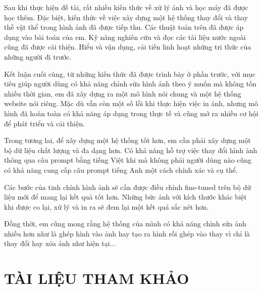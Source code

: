 \documentclass[12pt]{report}
\begin{document}
Sau khi thực hiện đề tài, rất nhiều kiến thức về xử lý ảnh và học máy đã được học thêm. Đặc biệt, kiến thức về việc xây dựng một hệ thống thay đổi và thay thế vật thể trong hình ảnh đã được tiếp thu. Các thuật toán trên đã được áp dụng vào bài toán của em. Kỹ năng nghiên cứu và đọc các tài liệu nước ngoài cũng đã được cải thiện. Hiểu và vận dụng, cải tiến linh hoạt những tri thức của những người đi trước.

Kết luận cuối cùng, từ những kiến thức đã được trình bày ở phần trước, với mục tiêu giúp người dùng có khả năng chỉnh sửa hình ảnh theo ý muốn mà không tốn nhiều thời gian, em đã xây dựng ra một mô hình nói chung và một hệ thống website nói riêng. Mặc dù vẫn còn một số lỗi khi thực hiện việc in ảnh, nhưng mô hình đã hoàn toàn có khả năng áp dụng trong thực tế và cũng mở ra nhiều cơ hội để phát triển và cải thiện.

Trong tương lai, để xây dựng một hệ thống tốt hơn, em cần phải xây dựng một bộ dữ liệu chất lượng và đa dạng hơn. Có khả năng hỗ trợ việc thay đổi hình ảnh thông qua câu prompt bằng tiếng Việt khi mà không phải người dùng nào cũng có khả năng cung cấp câu prompt tiếng Anh một cách chính xác và cụ thể.

Các bước của tinh chỉnh hình ảnh sẽ cần được điều chỉnh fine-tuned trên bộ dữ liệu mới để mang lại kết quả tốt hơn. Những bức ảnh với kích thước khác biệt khi được co lại, xử lý và in ra sẽ đem lại một kết quả sắc nét hơn.

Đồng thời, em cũng mong rằng hệ thống của mình có khả năng chỉnh sửa ảnh nhiều hơn như là ghép hình vào ảnh hay tạo ra hình rồi ghép vào thay vì chỉ là thay đổi hay xóa ảnh như hiện tại...

\chapter{TÀI LIỆU THAM KHẢO}
\end{document}
